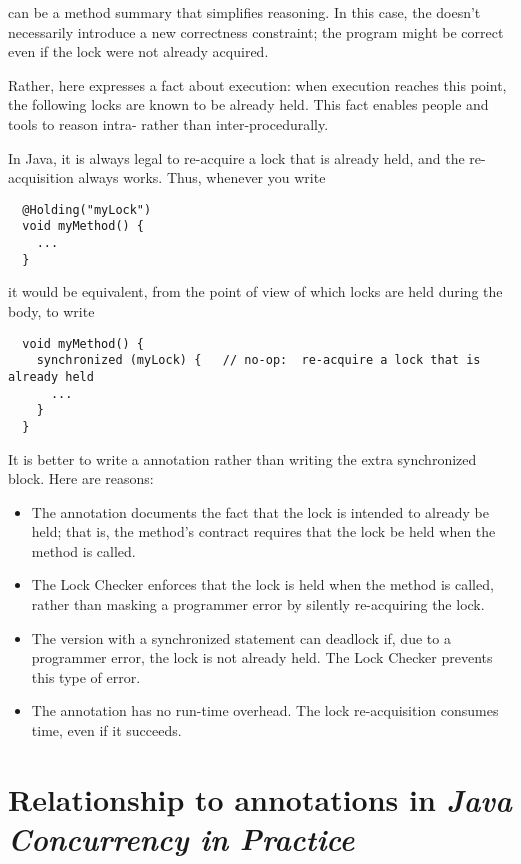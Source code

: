    can be a method summary that simplifies reasoning.  In
  this case, the  doesn't necessarily introduce a new
  correctness constraint; the program might be correct even if the lock
  were not already acquired.

  Rather, here  expresses a fact about execution:  when
  execution reaches this point, the following locks are known to be already held.  This
  fact enables people and tools to reason intra- rather than
  inter-procedurally.

  In Java, it is always legal to re-acquire a lock that is already held,
  and the re-acquisition always works.  Thus, whenever you write

\begin{Verbatim}
  @Holding("myLock")
  void myMethod() {
    ...
  }
\end{Verbatim}

\noindent
it would be equivalent, from the point of view of which locks are held
during the body, to write

\begin{Verbatim}
  void myMethod() {
    synchronized (myLock) {   // no-op:  re-acquire a lock that is already held
      ...
    }
  }
\end{Verbatim}


It is better to write a  annotation rather than writing the
extra synchronized block.  Here are reasons:

\begin{itemize}
\item
  The annotation documents the fact that the lock is intended to already be
  held;  that is, the method's contract requires that the lock be held when
  the method is called.
\item
  The Lock Checker enforces that the lock is held when the method is
  called, rather than masking a programmer error by silently re-acquiring
  the lock.
\item
  The version with a synchronized statement can deadlock if, due to a programmer error,
  the lock is not already held.  The Lock Checker prevents this type of
  error.
\item
  The annotation has no run-time overhead.  The lock re-acquisition
  consumes time, even if it succeeds.
\end{itemize}


\section{Relationship to annotations in \emph{Java Concurrency in Practice}\label{lock-jcip-annotations}}

